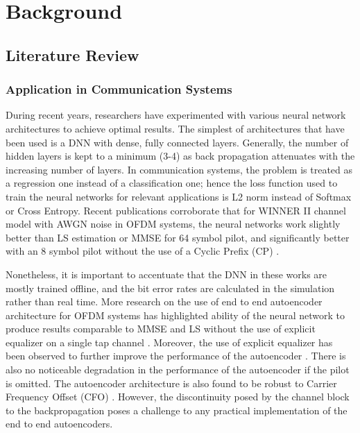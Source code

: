 
\chapter{Background} %
\label{Chapter2}
\lhead{} %

\section{Literature Review}
\subsection{Application in Communication Systems}
During recent years, researchers have experimented with various neural network architectures to achieve optimal results. The simplest of architectures that have been used is a DNN with dense, fully connected layers. Generally, the number of hidden layers is kept to a minimum (3-4) as back propagation attenuates with the increasing number of layers. In communication systems, the problem is treated as a regression one instead of a classification one; hence the loss function used to train the neural networks for relevant applications is L2 norm instead of Softmax or Cross Entropy. Recent publications corroborate that for WINNER II channel model with AWGN noise in OFDM systems, the neural networks work slightly better than LS estimation or MMSE for 64 symbol pilot, and significantly better with an 8 symbol pilot without the use of a Cyclic Prefix (CP) \cite{ye2018power}.

Nonetheless, it is important to accentuate that the DNN in these works are mostly trained offline, and the bit error rates are calculated in the simulation rather than real time. More research on the use of end to end autoencoder architecture for OFDM systems has highlighted ability of the neural network to produce results comparable to MMSE and LS without the use of explicit equalizer on a single tap channel \cite{felix2018ofdm}. Moreover, the use of explicit equalizer has been observed to further improve the performance of the autoencoder \cite{felix2018ofdm}. There is also no noticeable degradation in the performance of the autoencoder if the pilot is omitted. The autoencoder architecture is also found to be robust to Carrier Frequency Offset (CFO) \cite{felix2018ofdm}. However, the discontinuity posed by the channel block to the backpropagation poses a challenge to any practical implementation of the end to end autoencoders.  

